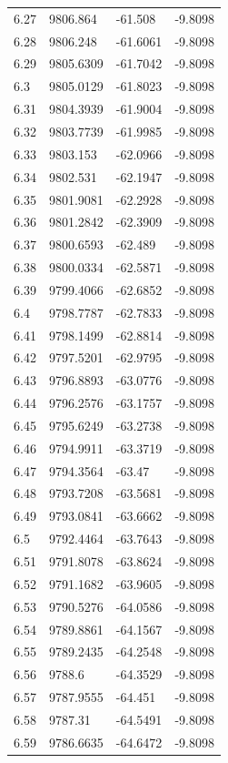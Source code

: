\begin{table}[H]
\begin{tabular}{llll}
6.27 & 9806.864 & -61.508 & -9.8098 \\
6.28 & 9806.248 & -61.6061 & -9.8098 \\
6.29 & 9805.6309 & -61.7042 & -9.8098 \\
6.3 & 9805.0129 & -61.8023 & -9.8098 \\
6.31 & 9804.3939 & -61.9004 & -9.8098 \\
6.32 & 9803.7739 & -61.9985 & -9.8098 \\
6.33 & 9803.153 & -62.0966 & -9.8098 \\
6.34 & 9802.531 & -62.1947 & -9.8098 \\
6.35 & 9801.9081 & -62.2928 & -9.8098 \\
6.36 & 9801.2842 & -62.3909 & -9.8098 \\
6.37 & 9800.6593 & -62.489 & -9.8098 \\
6.38 & 9800.0334 & -62.5871 & -9.8098 \\
6.39 & 9799.4066 & -62.6852 & -9.8098 \\
6.4 & 9798.7787 & -62.7833 & -9.8098 \\
6.41 & 9798.1499 & -62.8814 & -9.8098 \\
6.42 & 9797.5201 & -62.9795 & -9.8098 \\
6.43 & 9796.8893 & -63.0776 & -9.8098 \\
6.44 & 9796.2576 & -63.1757 & -9.8098 \\
6.45 & 9795.6249 & -63.2738 & -9.8098 \\
6.46 & 9794.9911 & -63.3719 & -9.8098 \\
6.47 & 9794.3564 & -63.47 & -9.8098 \\
6.48 & 9793.7208 & -63.5681 & -9.8098 \\
6.49 & 9793.0841 & -63.6662 & -9.8098 \\
6.5 & 9792.4464 & -63.7643 & -9.8098 \\
6.51 & 9791.8078 & -63.8624 & -9.8098 \\
6.52 & 9791.1682 & -63.9605 & -9.8098 \\
6.53 & 9790.5276 & -64.0586 & -9.8098 \\
6.54 & 9789.8861 & -64.1567 & -9.8098 \\
6.55 & 9789.2435 & -64.2548 & -9.8098 \\
6.56 & 9788.6 & -64.3529 & -9.8098 \\
6.57 & 9787.9555 & -64.451 & -9.8098 \\
6.58 & 9787.31 & -64.5491 & -9.8098 \\
6.59 & 9786.6635 & -64.6472 & -9.8098 \\

\end{tabular}
\end{table}
